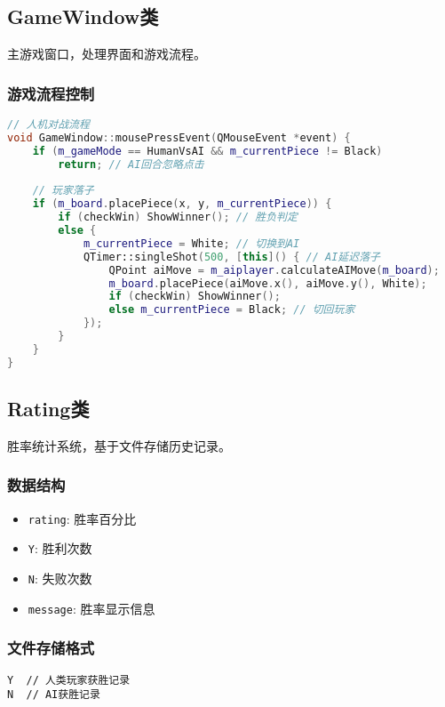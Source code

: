 \documentclass[UTF8]{ctexart}
\begin{document}
\subsection{GameWindow类}
主游戏窗口，处理界面和游戏流程。

\subsubsection{游戏流程控制}
\begin{lstlisting}[language=C++]
// 人机对战流程
void GameWindow::mousePressEvent(QMouseEvent *event) {
    if (m_gameMode == HumanVsAI && m_currentPiece != Black) 
        return; // AI回合忽略点击
    
    // 玩家落子
    if (m_board.placePiece(x, y, m_currentPiece)) {
        if (checkWin) ShowWinner(); // 胜负判定
        else {
            m_currentPiece = White; // 切换到AI
            QTimer::singleShot(500, [this]() { // AI延迟落子
                QPoint aiMove = m_aiplayer.calculateAIMove(m_board);
                m_board.placePiece(aiMove.x(), aiMove.y(), White);
                if (checkWin) ShowWinner();
                else m_currentPiece = Black; // 切回玩家
            });
        }
    }
}
\end{lstlisting}

\subsection{Rating类}
胜率统计系统，基于文件存储历史记录。

\subsubsection{数据结构}
\begin{itemize}
    \item \texttt{rating}: 胜率百分比
    \item \texttt{Y}: 胜利次数
    \item \texttt{N}: 失败次数
    \item \texttt{message}: 胜率显示信息
\end{itemize}

\subsubsection{文件存储格式}
\begin{lstlisting}
Y  // 人类玩家获胜记录
N  // AI获胜记录
\end{lstlisting}
\end{document}
